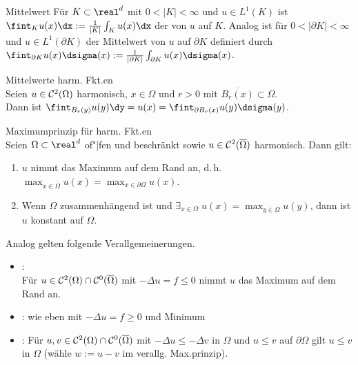 \begin{Def}{Mittelwert}
    Für $K \subset \real^d$ mit $0 < |K| < \infty$ und $u \in L^1(K)$ ist
    $\fint_K u(x) \dx := \frac{1}{|K|} \int_K u(x) \dx$
    der  von $u$ auf $K$.
    Analog ist für $0 < |\partial K| < \infty$ und $u \in L^1(\partial K)$
    der Mittelwert von $u$ auf $\partial K$ definiert durch
    $\fint_{\partial K} u(x) \dsigma(x) :=
    \frac{1}{|\partial K|} \int_{\partial K} u(x) \dsigma(x)$.
\end{Def}

\begin{Satz}{Mittelwerte harm. Fkt.en}\\
    Seien $u \in \mathcal{C}^2(\Omega)$ harmonisch, $x \in \Omega$ und $r > 0$ mit
    $\overline{B_r(x)} \subset \Omega$.\\
    Dann ist $\fint_{B_r(y)} u(y) \dy = u(x) = \fint_{\partial B_r(x)} u(y) \dsigma(y)$.
\end{Satz}

\linie

\begin{Satz}{Maximumprinzip für harm. Fkt.en}\\
    Seien $\Omega \subset \real^d$ of"|fen und beschränkt sowie
    $u \in \mathcal{C}^2(\overline{\Omega})$ harmonisch.
    Dann gilt:
    \begin{enumerate}
        \item
        $u$ nimmt das Maximum auf dem Rand an, d.\,h.
        $\max_{x \in \overline{\Omega}} u(x) = \max_{x \in \partial\Omega} u(x)$.

        \item
        Wenn $\Omega$ zusammenhängend ist und $\exists_{x \in \Omega}\;
        u(x) = \max_{y \in \overline{\Omega}} u(y)$, dann ist $u$ konstant auf $\Omega$.
    \end{enumerate}
\end{Satz}

\begin{Bem}
    Analog gelten folgende Verallgemeinerungen.
    \begin{itemize}
        \item
        :\\
        Für $u \in \mathcal{C}^2(\Omega) \cap \mathcal{C}^0(\overline{\Omega})$ mit $-\Delta u = f \le 0$
        nimmt $u$ das Maximum auf dem Rand an.

        \item
        :
        wie eben mit $-\Delta u = f \ge 0$ und Minimum

        \item
        :
        Für $u, v \in \mathcal{C}^2(\Omega) \cap \mathcal{C}^0(\overline{\Omega})$ mit $-\Delta u \le -\Delta v$ in
        $\Omega$ und $u \le v$ auf $\partial\Omega$ gilt $u \le v$ in $\Omega$
        (wähle $w := u - v$ im verallg. Max.prinzip).
    \end{itemize}
\end{Bem}

